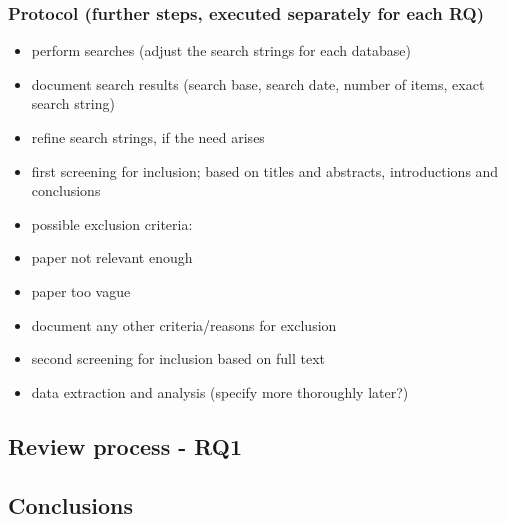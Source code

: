 \subsubsection[Protocol]{Protocol (further steps, executed separately for each RQ)}
\begin{itemize}
    \item perform searches (adjust the search strings for each database)
    \item document search results (search base, search date, number of items, exact search string)
    \item refine search strings, if the need arises
    \item first screening for inclusion; based on titles and abstracts, introductions and conclusions
    \item possible exclusion criteria:
    \item paper not relevant enough
    \item paper too vague
    \item document any other criteria/reasons for exclusion
    \item second screening for inclusion based on full text
    \item data extraction and analysis (specify more thoroughly later?)
\end{itemize}

\subsection{Review process - RQ1}\label{subsec:review-process---rq1}

\subsection{Conclusions}\label{subsec:conclusions}

